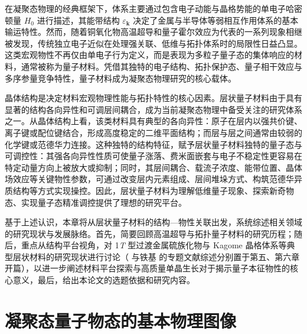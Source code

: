 %
在凝聚态物理的经典框架下，体系主要通过包含电子动能与晶格势能的单电子哈密顿量 $H_0$ 进行描述，其能带结构 $\varepsilon_{\mathbf{k}}$ 决定了金属与半导体等弱相互作用体系的基本输运特性。然而，随着铜氧化物高温超导和量子霍尔效应为代表的一系列现象相继被发现，传统独立电子近似在处理强关联、低维与拓扑体系时的局限性日益凸显。这类宏观物性不再仅由单电子行为定义，而是表现为多粒子量子态的集体响应的材料，通常被称为量子材料\cite{Hasan2010RevModPhys,Qi2011RevModPhys,Armitage2018RevModPhys}。凭借其独特的电子结构、拓扑保护态、量子相干效应与多序参量竞争特性，量子材料成为凝聚态物理研究的核心载体。

晶体结构是决定材料宏观物理性能与拓扑特性的核心因素。层状量子材料由于具有显著的结构各向异性和可调层间耦合，成为当前凝聚态物理中备受关注的研究体系之一。从晶体结构上看，该类材料具有典型的各向异性：原子在层内以强共价键、离子键或配位键结合，形成高度稳定的二维平面结构；而层与层之间通常由较弱的化学键或范德华力连接。这种独特的结构特征，赋予层状量子材料独特的量子态与可调控性：其强各向异性性质可使量子涨落、费米面嵌套与电子不稳定性更容易在特定动量方向上被放大或抑制；同时，其层间耦合、载流子浓度、能带位置、晶体场效应等关键物性参数，可通过改变层内元素组成、层间堆垛方式、构筑范德华异质结构等方式实现操控。因此，层状量子材料为理解低维量子现象、探索新奇物态、实现量子态精准调控提供了理想的研究平台。

基于上述认识，本章将从层状量子材料的结构—物性关联出发，系统综述相关领域的研究现状与发展脉络。首先，简要回顾高温超导与拓扑量子材料的研究历程；随后，重点从结构平台视角，对 1\textit{T} 型过渡金属硫族化物与 Kagome 晶格体系等典型层状材料的研究现状进行讨论（ 与铁基  的专题文献综述分别置于第五、第六章开篇），以进一步阐述材料平台探索与高质量单晶生长对于揭示量子本征物性的核心意义，最后，给出本论文的选题依据和研究内容。

\section{凝聚态量子物态的基本物理图像}

